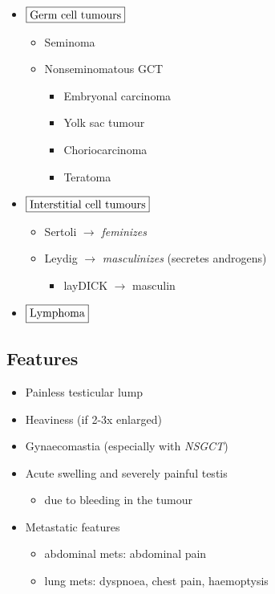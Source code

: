\documentclass[
  12pt,
]{memoir}
\providecommand{\tightlist}{%
  \setlength{\itemsep}{0pt}\setlength{\parskip}{0pt}}
\begin{document}
\begin{itemize}
\tightlist
\item
  \(\fbox{Germ cell tumours}\)

  \begin{itemize}
  \tightlist
  \item
    Seminoma
  \item
    Nonseminomatous GCT

    \begin{itemize}
    \tightlist
    \item
      Embryonal carcinoma
    \item
      Yolk sac tumour
    \item
      Choriocarcinoma
    \item
      Teratoma
    \end{itemize}
  \end{itemize}
\item
  \(\fbox{Interstitial cell tumours}\)

  \begin{itemize}
  \tightlist
  \item
    Sertoli \(\rightarrow\) \emph{feminizes}
  \item
    Leydig \(\rightarrow\) \emph{masculinizes} (secretes androgens)

    \begin{itemize}
    \tightlist
    \item
      layDICK \(\rightarrow\) masculin
    \end{itemize}
  \end{itemize}
\item
  \(\fbox{Lymphoma}\)
\end{itemize}

\hypertarget{features-9}{%
\subsection{Features}\label{features-9}}

\begin{itemize}
\tightlist
\item
  Painless testicular lump
\item
  Heaviness (if 2-3x enlarged)
\item
  Gynaecomastia (especially with \emph{NSGCT})
\item
  Acute swelling and severely painful testis

  \begin{itemize}
  \tightlist
  \item
    due to bleeding in the tumour
  \end{itemize}
\item
  Metastatic features

  \begin{itemize}
  \tightlist
  \item
    abdominal mets: abdominal pain
  \item
    lung mets: dyspnoea, chest pain, haemoptysis
  \end{itemize}
\end{itemize}
\end{document}
